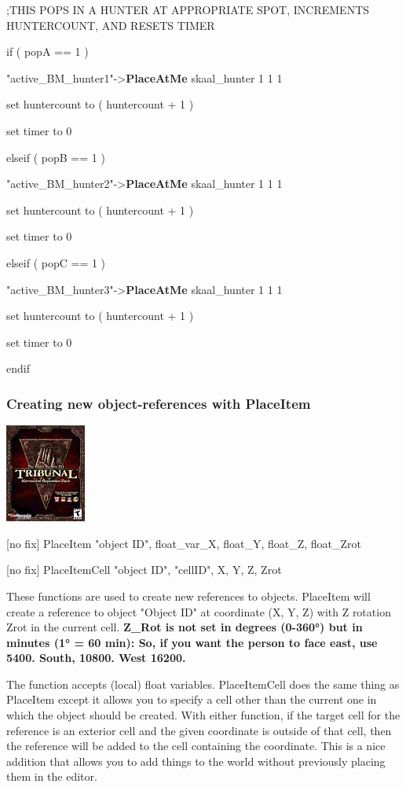 \documentclass[
]{article}
\begin{document}
;THIS POPS IN A HUNTER AT APPROPRIATE SPOT, INCREMENTS HUNTERCOUNT, AND
RESETS TIMER

if ( popA == 1 )

"active\_BM\_hunter1"-\textgreater{}\textbf{PlaceAtMe} skaal\_hunter 1 1
1

set huntercount to ( huntercount + 1 )

set timer to 0

elseif ( popB == 1 )

"active\_BM\_hunter2"-\textgreater{}\textbf{PlaceAtMe} skaal\_hunter 1 1
1

set huntercount to ( huntercount + 1 )

set timer to 0

elseif ( popC == 1 )

"active\_BM\_hunter3"-\textgreater{}\textbf{PlaceAtMe} skaal\_hunter 1 1
1

set huntercount to ( huntercount + 1 )

set timer to 0

endif

\hypertarget{creating-new-object-references-with-placeitem}{%
\subsubsection{Creating new object-references with
PlaceItem}\label{creating-new-object-references-with-placeitem}}

\includegraphics{media/image6.png}

{[}no fix{]} PlaceItem "object ID", float\_var\_X, float\_Y, float\_Z,
float\_Zrot

{[}no fix{]} PlaceItemCell "object ID", "cellID", X, Y, Z, Zrot

These functions are used to create new references to objects. PlaceItem
will create a reference to object "Object ID" at coordinate (X, Y, Z)
with Z rotation Zrot in the current cell. \textbf{Z\_Rot is not set in
degrees (0-360°) but in minutes (1° = 60 min): So, if you want the
person to face east, use 5400. South, 10800. West 16200.}

The function accepts (local) float variables. PlaceItemCell does the
same thing as PlaceItem except it allows you to specify a cell other
than the current one in which the object should be created. With either
function, if the target cell for the reference is an exterior cell and
the given coordinate is outside of that cell, then the reference will be
added to the cell containing the coordinate. This is a nice addition
that allows you to add things to the world without previously placing
them in the editor.
\end{document}
